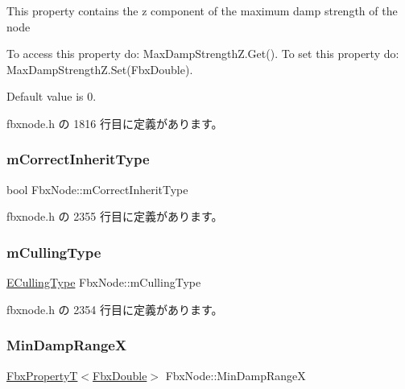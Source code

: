 This property contains the z component of the maximum damp strength of the node

To access this property do\+: Max\+Damp\+Strength\+Z.\+Get(). To set this property do\+: Max\+Damp\+Strength\+Z.\+Set(\+Fbx\+Double).

Default value is 0. 

 fbxnode.\+h の 1816 行目に定義があります。

\mbox{\label{class_fbx_node_acd21e92423faa682ac9270866e436924}} 
\subsubsection{\texorpdfstring{m\+Correct\+Inherit\+Type}{mCorrectInheritType}}
{\footnotesize\ttfamily bool Fbx\+Node\+::m\+Correct\+Inherit\+Type}



 fbxnode.\+h の 2355 行目に定義があります。

\mbox{\label{class_fbx_node_a897f88d6e23b1680d9452cd21b3d8add}} 
\subsubsection{\texorpdfstring{m\+Culling\+Type}{mCullingType}}
{\footnotesize\ttfamily \hyperlink{class_fbx_node_afdb6d2c1708802d8b175f5094ff06046}{E\+Culling\+Type} Fbx\+Node\+::m\+Culling\+Type}



 fbxnode.\+h の 2354 行目に定義があります。

\mbox{\label{class_fbx_node_a909da57f9cf8bb6e9e15c1d95b7919b6}} 
\subsubsection{\texorpdfstring{Min\+Damp\+RangeX}{MinDampRangeX}}
{\footnotesize\ttfamily \hyperlink{class_fbx_property_t}{Fbx\+PropertyT}$<$\hyperlink{fbxtypes_8h_a171e72a1c46fc15c1a6c9c31948c1c5b}{Fbx\+Double}$>$ Fbx\+Node\+::\+Min\+Damp\+RangeX}

